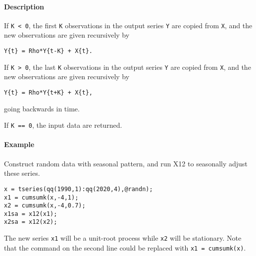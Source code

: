 \paragraph{Description}\label{description}

If \texttt{K \textless{} 0}, the first \texttt{K} observations in the
output series \texttt{Y} are copied from \texttt{X}, and the new
observations are given recursively by

\begin{verbatim}
Y{t} = Rho*Y{t-K} + X{t}.
\end{verbatim}

If \texttt{K \textgreater{} 0}, the last \texttt{K} observations in the
output series \texttt{Y} are copied from \texttt{X}, and the new
observations are given recursively by

\begin{verbatim}
Y{t} = Rho*Y{t+K} + X{t},
\end{verbatim}

going backwards in time.

If \texttt{K == 0}, the input data are returned.

\paragraph{Example}\label{example}

Construct random data with seasonal pattern, and run X12 to seasonally
adjust these series.

\begin{verbatim}
x = tseries(qq(1990,1):qq(2020,4),@randn);
x1 = cumsumk(x,-4,1);
x2 = cumsumk(x,-4,0.7);
x1sa = x12(x1);
x2sa = x12(x2);
\end{verbatim}

The new series \texttt{x1} will be a unit-root process while \texttt{x2}
will be stationary. Note that the command on the second line could be
replaced with \texttt{x1 = cumsumk(x)}.



